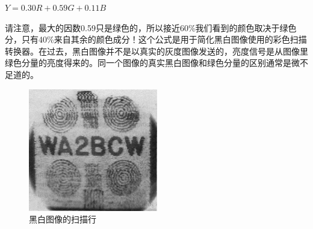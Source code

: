 $Y=0.30R+0.59G+0.11B$

请注意，最大的因数0.59只是绿色的，所以接近60\%我们看到的颜色取决于绿色分，只有40\%来自其余的颜色成分！这个公式是用于简化黑白图像使用的彩色扫描转换器。在过去，黑白图像并不是以真实的灰度图像发送的，亮度信号是从图像里绿色分量的亮度得来的。同一个图像的真实黑白图像和绿色分量的区别通常是微不足道的。

\begin{figure}
	\centering
	\includegraphics[width=0.7\linewidth]{figs/obrazek1.png}
	\caption{黑白图像的扫描行}
\end{figure}

